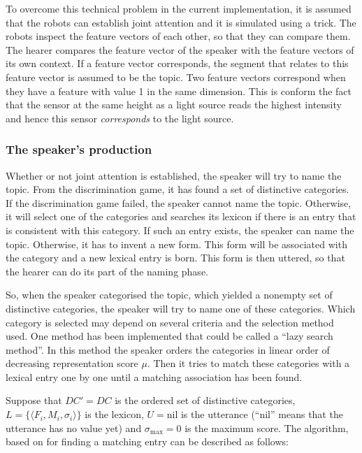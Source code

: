 To overcome this technical problem in the current implementation, it is assumed that the robots can establish joint attention and it is simulated using a trick. The robots inspect the feature vectors of each other, so that they can compare them. The hearer compares the feature vector of the speaker with the feature vectors of its own context. If a feature vector corresponds, the segment that relates to this feature vector is assumed to be the topic. Two feature vectors correspond when they have a feature with value 1 in the same dimension. This is conform the fact that the sensor at the same height as a light source reads the highest intensity and hence this sensor {\em corresponds} to the light source.

\subsubsection{The speaker's production}\label{s:cm:production}

Whether or not joint attention is established, the speaker will try to name the topic. From the discrimination game, it has found a set of distinctive categories. If the discrimination game failed, the speaker cannot name the topic. Otherwise, it will select one of the categories and searches its lexicon if there is an entry that is consistent with this category. If such an entry exists, the speaker can name the topic. Otherwise, it has to invent a new form. This form will be associated with the category and a new lexical entry is born. This form is then uttered, so that the hearer can do its part of the naming phase. 

So, when the speaker categorised the topic, which yielded a nonempty set of distinctive categories, the speaker will try to name one of these categories. Which category is selected may depend on several criteria and the selection method used. One method has been implemented that could be called a ``lazy search method''. In this method the speaker orders the categories in linear order of decreasing representation score $\mu$. Then it tries to match these categories with a lexical entry one by one until a matching association has been found.

\enlargethispage{1\baselineskip}
Suppose that $DC'=DC$ is the ordered set of distinctive categories, $L=\{\langle F_i,M_i,\sigma_i \rangle \}$ is the lexicon, $U=\mbox{nil}$ is the utterance (``nil'' means that the utterance has no value yet) and $\sigma_{\mbox{max}}=0$ is the maximum score. The algorithm, based on \citet{steels:1996a} for finding a matching entry can be described as follows:

